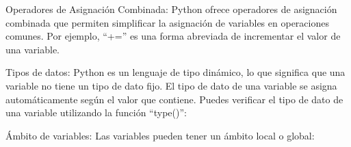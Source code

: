 Operadores de Asignación Combinada: Python ofrece operadores de asignación combinada que permiten simplificar la asignación de variables en operaciones comunes. Por ejemplo, ``+='' es una forma abreviada de incrementar el valor de una variable.\\

\begin{figure}[h]
    \centering
  \end{figure}

Tipos de datos: Python es un lenguaje de tipo dinámico, lo que significa que una variable no tiene un tipo de dato fijo. El tipo de dato de una variable se asigna automáticamente según el valor que contiene. Puedes verificar el tipo de dato de una variable utilizando la función ``type()'':\\

\begin{figure}[h]
    \centering
  \end{figure}

Ámbito de variables: Las variables pueden tener un ámbito local o global:

